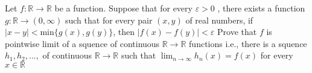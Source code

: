 Let $f:\mathbb{R}\to \mathbb{R}$ be a function. Suppose that for every $\varepsilon >0$ , there exists a function $g:\mathbb{R}\to (0,\infty)$ such that for every pair $(x,y)$ of real numbers,
if $|x-y|<\text{min}\{g(x),g(y)\}$, then $|f(x)-f(y)|<\varepsilon$
Prove that $f$ is pointwise limit of a squence of continuous $\mathbb{R}\to \mathbb{R}$ functions i.e., there is a squence $h_1,h_2,...,$ of continuous $\mathbb{R}\to \mathbb{R}$ such that $\lim_{n\to \infty}h_n(x)=f(x)$ for every $x\in \mathbb{R}$